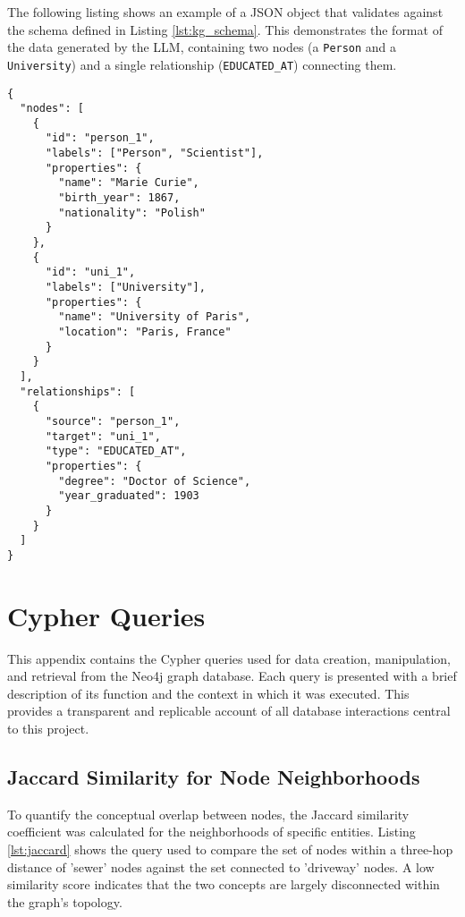 The following listing shows an example of a JSON object that validates against the schema defined in Listing \ref{lst:kg_schema}. This demonstrates the format of the data generated by the LLM, containing two nodes (a \texttt{Person} and a \texttt{University}) and a single relationship (\texttt{EDUCATED\_AT}) connecting them.

\begin{lstlisting}[style=json, caption={An example of a valid knowledge graph JSON object conforming to the schema.}, label={lst:kg_example}]
{
  "nodes": [
    {
      "id": "person_1",
      "labels": ["Person", "Scientist"],
      "properties": {
        "name": "Marie Curie",
        "birth_year": 1867,
        "nationality": "Polish"
      }
    },
    {
      "id": "uni_1",
      "labels": ["University"],
      "properties": {
        "name": "University of Paris",
        "location": "Paris, France"
      }
    }
  ],
  "relationships": [
    {
      "source": "person_1",
      "target": "uni_1",
      "type": "EDUCATED_AT",
      "properties": {
        "degree": "Doctor of Science",
        "year_graduated": 1903
      }
    }
  ]
}
\end{lstlisting}

\chapter{Cypher Queries}
\label{app:cypher_queries}

This appendix contains the Cypher queries used for data creation, manipulation, and retrieval from the Neo4j graph database. Each query is presented with a brief description of its function and the context in which it was executed. This provides a transparent and replicable account of all database interactions central to this project.

\section{Jaccard Similarity for Node Neighborhoods}

To quantify the conceptual overlap between nodes, the Jaccard similarity coefficient was calculated for the neighborhoods of specific entities. Listing \ref{lst:jaccard} shows the query used to compare the set of nodes within a three-hop distance of 'sewer' nodes against the set connected to 'driveway' nodes. A low similarity score indicates that the two concepts are largely disconnected within the graph's topology.

